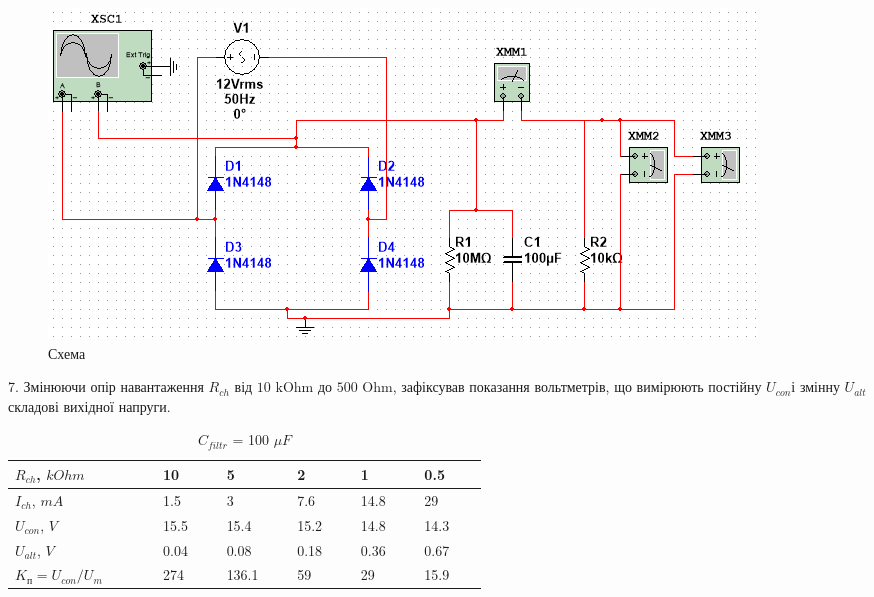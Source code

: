 \documentclass{article}
\begin{document}
\begin{normalsize}
			\begin{figure}[H]
		\centering
		\includegraphics[width=\textwidth]{s3}
		\caption{Схема}
	\end{figure}
	
	
	7.  Змінюючи опір навантаження $R_{ch}$ від $10\text{ kOhm}$ до $500\text{ Ohm}$, зафіксував показання вольтметрів, що вимірюють постійну $U_{con}$і змінну $U_{alt}$ складові вихідної напруги.
	
	\begin{table}[H]
		\centering
		\renewcommand*\arraystretch{1.3}
		\begin{tabular}{|p{0.15\linewidth}|p{0.08\linewidth}|p{0.08\linewidth}|p{0.08\linewidth}|p{0.08\linewidth}|p{0.08\linewidth}|}
			\hline
			$R_{ch}$, $kOhm$& 10 & 5 & 2 & 1 & 0.5\\
			\hline
			$I_{ch}$, $mA$& 1.5 &3 & 7.6 & 14.8 & 29 \\
			\hline
			$U_{con}$, $V$& 15.5 & 15.4 & 15.2 & 14.8 & 14.3\\
			\hline
			$U_{alt}$, $V$& 0.04 & 0.08 & 0.18 & 0.36 & 0.67\\
			\hline
			$K_\text{п}=U_{con}/U_{m}$& 274 & 136.1 & 59 & 29 & 15.9\\
			\hline
		\end{tabular}
				\caption{$C_{filtr}$ = 100 $\mu F$}
	\end{table}
	

\end{normalsize}
\end{document}
